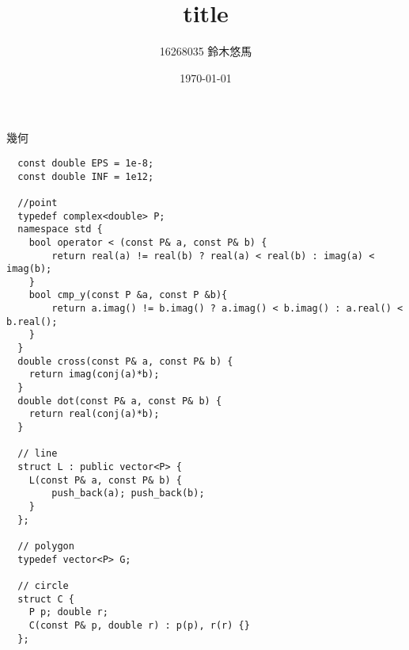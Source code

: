 \documentclass[11pt,a4paper]{jsarticle}
\title{title}
\author{16268035 鈴木悠馬}
\date{\today}
\begin{document}
幾何
\begin{lstlisting}
  const double EPS = 1e-8;
  const double INF = 1e12;

  //point
  typedef complex<double> P;
  namespace std {
  	bool operator < (const P& a, const P& b) {
  		return real(a) != real(b) ? real(a) < real(b) : imag(a) < imag(b);
  	}
  	bool cmp_y(const P &a, const P &b){
  		return a.imag() != b.imag() ? a.imag() < b.imag() : a.real() < b.real();
  	}
  }
  double cross(const P& a, const P& b) {
  	return imag(conj(a)*b);
  }
  double dot(const P& a, const P& b) {
  	return real(conj(a)*b);
  }

  // line
  struct L : public vector<P> {
  	L(const P& a, const P& b) {
  		push_back(a); push_back(b);
  	}
  };

  // polygon
  typedef vector<P> G;

  // circle
  struct C {
  	P p; double r;
  	C(const P& p, double r) : p(p), r(r) {}
  };
\end{lstlisting}
\end{document}
